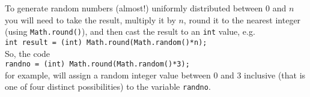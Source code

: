 \noindent
To generate random numbers (almost!) uniformly distributed
between $0$ and $n$ you will need to take the result, multiply it by $n$, 
round it to the nearest integer (using {\tt Math.round()}), and then  
cast the result to an {\tt int} value, e.g. \\

{\tt int result = (int) Math.round(Math.random()*n);} \\

\noindent
So, the code \\

{\tt randno = (int) Math.round(Math.random()*3);} \\

\noindent
for example, will assign a random integer value between 0 and 3 inclusive 
(that is one of four distinct possibilities) to the variable {\tt randno}.
